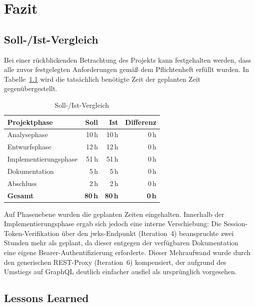 \documentclass[11pt, a4paper, oneside]{report}
\begin{document}
\chapter{Fazit}

\section{Soll-/Ist-Vergleich}

Bei einer rückblickenden Betrachtung des Projekts kann festgehalten werden, dass alle
zuvor festgelegten Anforderungen gemäß dem Pflichtenheft erfüllt wurden. In
Tabelle~\ref{tab:soll_ist} wird die tatsächlich benötigte Zeit der geplanten Zeit
gegenübergestellt.

\begin{table}[H]
  \centering
  \caption{Soll-/Ist-Vergleich}
  \label{tab:soll_ist}
  \begin{tabularx}{0.75\textwidth}{X r r r}
    \toprule
    \textbf{Projektphase} & \textbf{Soll} & \textbf{Ist} & \textbf{Differenz} \\
    \midrule
    Analysephase          & 10\,h & 10\,h & 0\,h \\
    Entwurfsphase         & 12\,h & 12\,h & 0\,h \\
    Implementierungsphase & 51\,h & 51\,h & 0\,h \\
    Dokumentation         &  5\,h &  5\,h & 0\,h \\
    Abschluss             &  2\,h &  2\,h & 0\,h \\
    \midrule
    \textbf{Gesamt}       & \textbf{80\,h} & \textbf{80\,h} & \textbf{0\,h} \\
    \bottomrule
  \end{tabularx}
\end{table}

Auf Phasenebene wurden die geplanten Zeiten eingehalten. Innerhalb der Implementierungsphase
ergab sich jedoch eine interne Verschiebung: Die Session-Token-Verifikation über den
\gls{jwks}-Endpunkt (Iteration~4) beanspruchte zwei Stunden mehr als geplant, da dieser
entgegen der verfügbaren Dokumentation eine eigene Bearer-Authentifizierung erforderte.
Dieser Mehraufwand wurde durch den generischen REST-Proxy (Iteration~6) kompensiert,
der aufgrund des Umstiegs auf GraphQL deutlich einfacher ausfiel als ursprünglich vorgesehen.

\section{Lessons Learned}
\label{sec:lessons}
\end{document}
